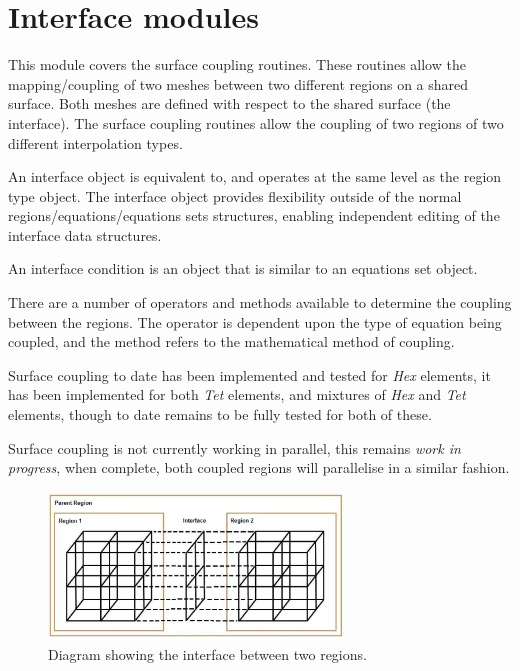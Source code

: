 \section{Interface modules}
\label{sec:interfacemodules}

This module covers the surface coupling routines. These routines allow the 
mapping/coupling of two meshes between two different regions on a shared
surface. Both meshes are defined with respect to the shared surface (the 
interface). The surface coupling routines allow the coupling of two regions 
of two different interpolation types. 

An interface object is equivalent to, and operates at the same level as 
the region type object. The interface object provides flexibility outside 
of the normal regions/equations/equations sets structures, enabling 
independent editing of the interface data structures.

An interface condition is an object that is similar to an equations set 
object. 

There are a number of operators and methods available to determine the 
coupling between the regions. The operator is dependent upon the type of 
equation being coupled, and the method refers to the mathematical method of 
coupling.

Surface coupling to date has been implemented and tested for \emph{Hex} 
elements, it has been implemented for both \emph{Tet} elements, and mixtures 
of \emph{Hex} and \emph{Tet} elements, though to date remains to be fully 
tested for both of these.

Surface coupling is not currently working in parallel, this remains 
\emph{work in progress}, when complete, both coupled regions will 
parallelise in a similar fashion.

\begin{figure}
\centering
      \includegraphics[width=0.7\textwidth]{figs/Modules/interfaces.eps}
\caption{Diagram showing the interface between two regions.}
\label{Interfaces}
\end{figure}



